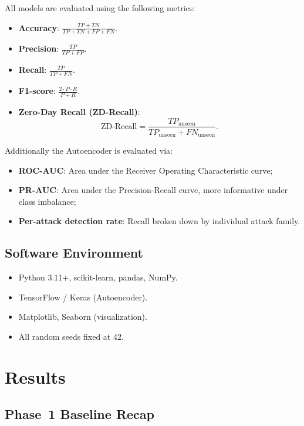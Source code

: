 \documentclass[10pt,conference]{IEEEtran}
\begin{document}
All models are evaluated using the following metrics:
\begin{itemize}[leftmargin=*,noitemsep]
  \item \textbf{Accuracy}: $\frac{TP+TN}{TP+TN+FP+FN}$.
  \item \textbf{Precision}: $\frac{TP}{TP+FP}$.
  \item \textbf{Recall}: $\frac{TP}{TP+FN}$.
  \item \textbf{F1-score}: $\frac{2 \cdot P \cdot R}{P + R}$.
  \item \textbf{Zero-Day Recall (ZD-Recall)}:
\begin{equation}
  \text{ZD-Recall}
  = \frac{TP_{\text{unseen}}}{TP_{\text{unseen}} + FN_{\text{unseen}}}.
  \label{eq:zdrecall}
\end{equation}
\end{itemize}
Additionally the Autoencoder is evaluated via:
\begin{itemize}[leftmargin=*,noitemsep]
  \item \textbf{ROC-AUC}: Area under the Receiver Operating
        Characteristic curve;
  \item \textbf{PR-AUC}: Area under the Precision-Recall curve,
        more informative under class imbalance;
  \item \textbf{Per-attack detection rate}: Recall broken down
        by individual attack family.
\end{itemize}

\subsection{Software Environment}
\begin{itemize}[leftmargin=*,noitemsep]
  \item Python 3.11+, scikit-learn, pandas, NumPy.
  \item TensorFlow / Keras (Autoencoder).
  \item Matplotlib, Seaborn (visualization).
  \item All random seeds fixed at 42.
\end{itemize}

\section{Results}
\label{sec:results}

\subsection{Phase~1 Baseline Recap}
\end{document}
